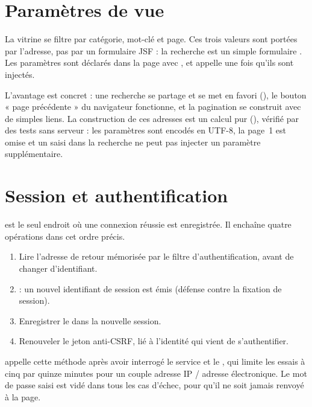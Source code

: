 \section{Paramètres de vue}
La vitrine se filtre par catégorie, mot-clé et page. Ces trois valeurs sont portées par l'adresse, pas par un
formulaire JSF : la recherche est un simple formulaire . Les paramètres sont déclarés dans la page avec
, et  appelle  une fois qu'ils sont injectés.



L'avantage est concret : une recherche se partage et se met en favori (), le bouton
« page précédente » du navigateur fonctionne, et la pagination se construit avec de simples liens. La construction de
ces adresses est un calcul pur (), vérifié par des tests sans serveur : les
paramètres sont encodés en UTF-8, la page~1 est omise et un \code{\&} saisi dans la recherche ne peut pas injecter un
paramètre supplémentaire.

\section{Session et authentification}\label{sec:usersession}
 est le seul endroit où une connexion réussie est enregistrée. Il enchaîne quatre opérations dans cet
ordre précis.



\begin{enumerate}
  \item Lire l'adresse de retour mémorisée par le filtre d'authentification, avant de changer d'identifiant.
  \item {} : un nouvel identifiant de session est émis (défense contre la fixation de session).
  \item Enregistrer le  dans la nouvelle session.
  \item Renouveler le jeton anti-CSRF, lié à l'identité qui vient de s'authentifier.
\end{enumerate}

 appelle cette méthode après avoir interrogé le service et le , qui limite
les essais à cinq par quinze minutes pour un couple adresse IP / adresse électronique. Le mot de passe saisi est vidé
dans tous les cas d'échec, pour qu'il ne soit jamais renvoyé à la page.

